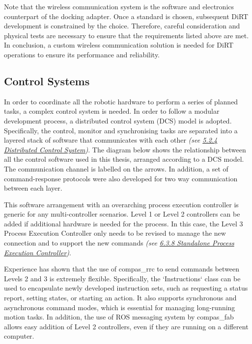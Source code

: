 Note that the wireless communication system is the software and electronics counterpart of the docking adapter. Once a standard is chosen, subsequent DiRT development is constrained by the choice. Therefore, careful consideration and physical tests are necessary to ensure that the requirements listed above are met. In conclusion, a custom wireless communication solution is needed for DiRT operations to ensure its performance and reliability.

\subsection{Control Systems}
\label{subsection:discussion_control_systems}

In order to coordinate all the robotic hardware to perform a series of planned tasks, a complex control system is needed. In order to follow a modular development process, a distributed control system (DCS) model is adopted. Specifically, the control, monitor and synchronising tasks are separated into a layered stack of software that communicates with each other \textit{(see \ul{5.2.4 Distributed Control System})}. The diagram below shows the relationship between all the control software used in this thesis, arranged according to a DCS model. The communication channel is labelled on the arrows. In addition, a set of command-response protocols were also developed for two way communication between each layer. 



This software arrangement with an overarching process execution controller is generic for any multi-controller scenarios. Level 1 or Level 2 controllers can be added if additional hardware is needed for the process. In this case, the Level 3 Process Execution Controller only needs to be revised to manage the new connection and to support the new commands \textit{(see \ul{6.3.8 Standalone Process Execution Controller})}. 

Experience has shown that the use of compas\_rrc \parencite{fleischmannCOMPASRRCOnline2020} to send commands between Levels 2 and 3 is extremely flexible. Specifically, the `Instructions` class can be used to encapsulate newly developed instruction sets, such as requesting a status report, setting states, or starting an action. It also supports synchronous and asynchronous command modes, which is essential for managing long-running motion tasks. In addition, the use of ROS messaging system by compas\_fab allows easy addition of Level 2 controllers, even if they are running on a different computer. 

